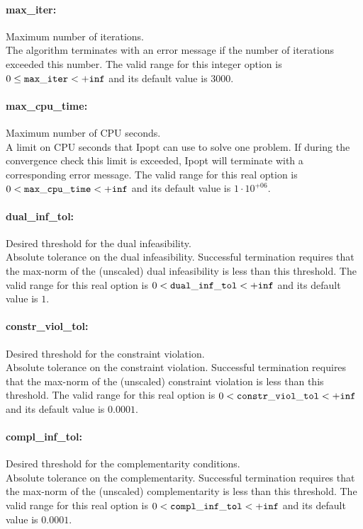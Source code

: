 \paragraph{max\_iter:}\label{opt:max_iter} Maximum number of iterations. \\
 The algorithm terminates with an error message if
the number of iterations exceeded this number. The valid range for this integer option is
$0 \le {\tt max\_iter } <  {\tt +inf}$
and its default value is $3000$.


\paragraph{max\_cpu\_time:}\label{opt:max_cpu_time} Maximum number of CPU seconds. \\
 A limit on CPU seconds that Ipopt can use to
solve one problem.  If during the convergence
check this limit is exceeded, Ipopt will
terminate with a corresponding error message. The valid range for this real option is 
$0 <  {\tt max\_cpu\_time } <  {\tt +inf}$
and its default value is $1 \cdot 10^{+06}$.


\paragraph{dual\_inf\_tol:}\label{opt:dual_inf_tol} Desired threshold for the dual infeasibility. \\
 Absolute tolerance on the dual infeasibility.
Successful termination requires that the max-norm
of the (unscaled) dual infeasibility is less than
this threshold. The valid range for this real option is 
$0 <  {\tt dual\_inf\_tol } <  {\tt +inf}$
and its default value is $1$.


\paragraph{constr\_viol\_tol:}\label{opt:constr_viol_tol} Desired threshold for the constraint violation. \\
 Absolute tolerance on the constraint violation.
Successful termination requires that the max-norm
of the (unscaled) constraint violation is less
than this threshold. The valid range for this real option is 
$0 <  {\tt constr\_viol\_tol } <  {\tt +inf}$
and its default value is $0.0001$.


\paragraph{compl\_inf\_tol:}\label{opt:compl_inf_tol} Desired threshold for the complementarity conditions. \\
 Absolute tolerance on the complementarity.
Successful termination requires that the max-norm
of the (unscaled) complementarity is less than
this threshold. The valid range for this real option is 
$0 <  {\tt compl\_inf\_tol } <  {\tt +inf}$
and its default value is $0.0001$.


